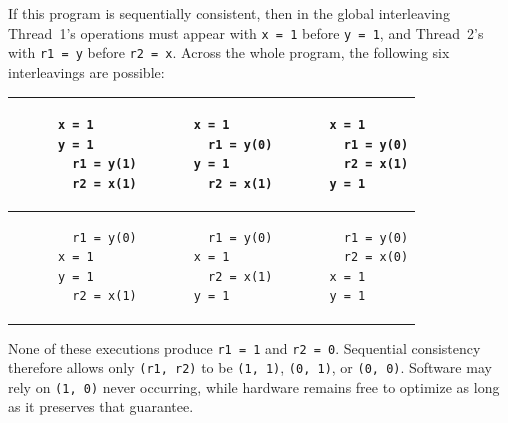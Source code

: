 \documentclass[fontsize=10pt, oneside]{scrartcl}
\newcommand{\monobox}[1]{\mbox{\texttt{#1}}}
\begin{document}
If this program is sequentially consistent, then in the global interleaving Thread~1's operations must appear with \monobox{x = 1} before \monobox{y = 1}, and Thread~2's with \monobox{r1 = y} before \monobox{r2 = x}.
Across the whole program, the following six interleavings are possible:

\begin{center}
\noindent
\begin{tabular}{|c|c|c|} \hline
\begin{minipage}{0.28\linewidth}
\begin{lstlisting}
x = 1
y = 1
        r1 = y(1)
        r2 = x(1)
\end{lstlisting}
\end{minipage} &
\begin{minipage}{0.28\linewidth}
\begin{lstlisting}
x = 1
        r1 = y(0)
y = 1
        r2 = x(1)
\end{lstlisting}
\end{minipage} &
\begin{minipage}{0.28\linewidth}
\begin{lstlisting}
x = 1
        r1 = y(0)
        r2 = x(1)
y = 1
\end{lstlisting}
\end{minipage} \\ \hline
\begin{minipage}{0.28\linewidth}
\begin{lstlisting}
        r1 = y(0)
x = 1
y = 1
        r2 = x(1)
\end{lstlisting}
\end{minipage} &
\begin{minipage}{0.28\linewidth}
\begin{lstlisting}
        r1 = y(0)
x = 1
        r2 = x(1)
y = 1
\end{lstlisting}
\end{minipage} &
\begin{minipage}{0.28\linewidth}
\begin{lstlisting}
        r1 = y(0)
        r2 = x(0)
x = 1
y = 1
\end{lstlisting}
\end{minipage} \\ \hline
\end{tabular}
\end{center}

None of these executions produce \monobox{r1 = 1} and \monobox{r2 = 0}.
Sequential consistency therefore allows only \monobox{(r1, r2)} to be \monobox{(1, 1)}, \monobox{(0, 1)}, or \monobox{(0, 0)}.
Software may rely on \monobox{(1, 0)} never occurring, while hardware remains free to optimize as long as it preserves that guarantee.
\end{document}
